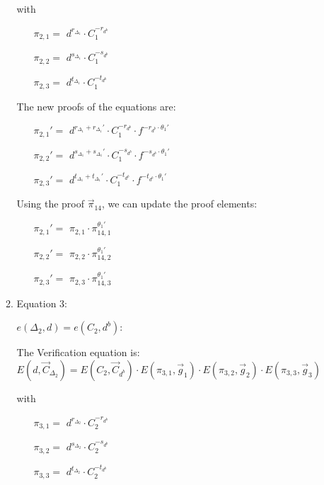 \begin{description}
\begin{enumerate}
\begin{enumerate}
      with
      \begin{itemize}
      \item[$\pi_{2,1} = $] $d^{r_{\Delta_1}} \cdot C_1^{-r_{d^b}}$
      \item[$\pi_{2,2} = $] $d^{s_{\Delta_1}} \cdot C_1^{-s_{d^b}}$
      \item[$\pi_{2,3} = $] $d^{t_{\Delta_1}} \cdot C_1^{-t_{d^b}}$
      \end{itemize}

      The new proofs of the equations are:
      
      \begin{itemize}
      \item[$\pi_{2,1}' = $] $d^{r_{\Delta_1} + r_{\Delta_1}'} \cdot C_1^{-r_{d^b}} \cdot f^{-r_{d^b} \cdot \theta_1'}$    
      \item[$\pi_{2,2}' = $] $d^{s_{\Delta_1} + s_{\Delta_1}'} \cdot C_1^{-s_{d^b}} \cdot f^{-s_{d^b} \cdot \theta_1'}$    
      \item[$\pi_{2,3}' = $] $d^{t_{\Delta_1} + t_{\Delta_1}'} \cdot C_1^{-t_{d^b}} \cdot f^{-t_{d^b} \cdot \theta_1'}$
      \end{itemize}
      
      Using the proof $\vec{\pi}_{14}$, we can update the proof elements:
      \begin{itemize}
      \item[$\pi_{2,1}' = $] $\pi_{2,1} \cdot \pi_{14,1}^{\theta_1'}$    
      \item[$\pi_{2,2}' = $] $\pi_{2,2} \cdot \pi_{14,2}^{\theta_1'}$    
      \item[$\pi_{2,3}' = $] $\pi_{2,3} \cdot \pi_{14,3}^{\theta_1'}$
      \end{itemize}



    \item Equation 3:
      
      $e(\boxed{\Delta_2},d) = e(C_2, \boxed{d^b})$:
      
      The Verification equation is:  $E(d, \vec{C}_{\Delta_2}) = E(C_2, \vec{C}_{d^b}) \cdot E(\pi_{3,1}, \vec{g}_1)\cdot E(\pi_{3,2}, \vec{g}_2)\cdot E(\pi_{3,3}, \vec{g}_3)$
      
      with
      \begin{itemize}
      \item[$\pi_{3,1} = $] $d^{r_{\Delta_2}} \cdot C_2^{-r_{d^b}}$
      \item[$\pi_{3,2} = $] $d^{s_{\Delta_2}} \cdot C_2^{-s_{d^b}}$
      \item[$\pi_{3,3} = $] $d^{t_{\Delta_2}} \cdot C_2^{-t_{d^b}}$
      \end{itemize}
      

\end{enumerate}
\end{enumerate}
\end{description}
